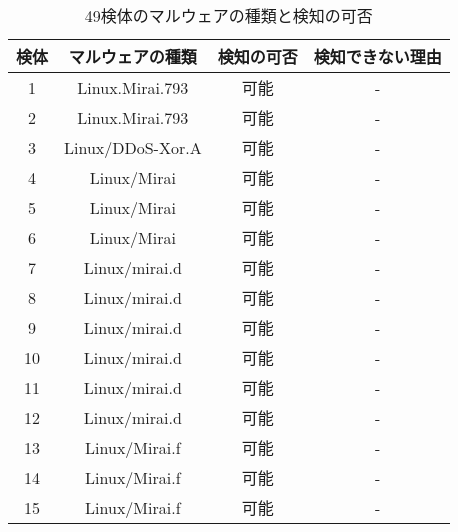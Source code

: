 \begin{small}
\begin{longtable}{|c|c|c|l|}
    
    \caption{49検体のマルウェアの種類と検知の可否}
    \label{tab:malware} \\
    \hline
    検体   & マルウェアの種類             & 検知の可否 & 検知できない理由                      \\ \hline
    \endhead 
    
        1  & Linux.Mirai.793      & 可能    & \multicolumn{1}{c|}{-} \\ \hline
        2  & Linux.Mirai.793      & 可能    & \multicolumn{1}{c|}{-}                             \\ \hline
        3  & Linux/DDoS-Xor.A     & 可能    & \multicolumn{1}{c|}{-}                             \\ \hline
        4  & Linux/Mirai          & 可能    & \multicolumn{1}{c|}{-}                             \\ \hline
        5  & Linux/Mirai          & 可能    & \multicolumn{1}{c|}{-}                             \\ \hline
        6  & Linux/Mirai          & 可能    & \multicolumn{1}{c|}{-}                             \\ \hline
        7  & Linux/mirai.d        & 可能    & \multicolumn{1}{c|}{-}                             \\ \hline
        8  & Linux/mirai.d        & 可能    & \multicolumn{1}{c|}{-}                             \\ \hline
        9  & Linux/mirai.d        & 可能    & \multicolumn{1}{c|}{-}                             \\ \hline
        10 & Linux/mirai.d        & 可能    & \multicolumn{1}{c|}{-}                             \\ \hline
        11 & Linux/mirai.d        & 可能    & \multicolumn{1}{c|}{-}                             \\ \hline
        12 & Linux/mirai.d        & 可能    & \multicolumn{1}{c|}{-}                             \\ \hline
        13 & Linux/Mirai.f        & 可能    & \multicolumn{1}{c|}{-}                             \\ \hline
        14 & Linux/Mirai.f        & 可能    & \multicolumn{1}{c|}{-}                             \\ \hline
        15 & Linux/Mirai.f        & 可能    & \multicolumn{1}{c|}{-}                             \\ \hline

\end{longtable}
\end{small}
